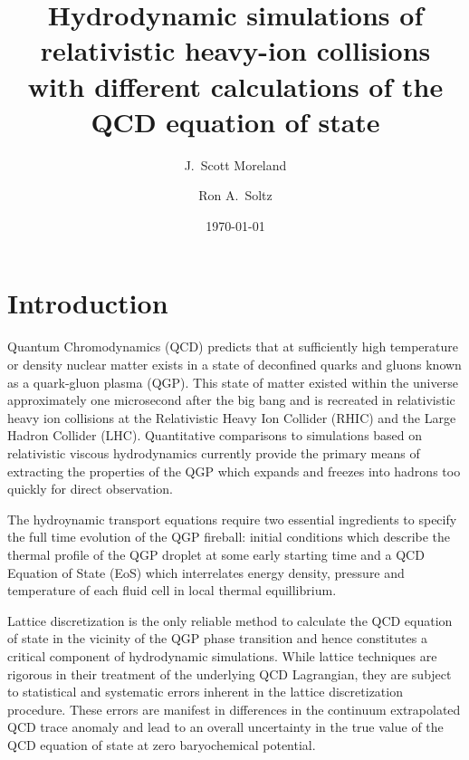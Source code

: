 \documentclass[aps,prc,reprint,amsmath,nofootinbib,superscriptaddress]{revtex4-1}
\begin{document}
\title{Hydrodynamic simulations of relativistic heavy-ion collisions\\ with different calculations of the QCD equation of state}

\author{J.\ Scott Moreland}
\author{Ron A.\ Soltz}

\date{\today}

\begin{abstract} 
   
\end{abstract}

\maketitle

\section{Introduction}

Quantum Chromodynamics (QCD) predicts that at sufficiently high temperature or density nuclear matter exists in a state of deconfined 
quarks and gluons known as a quark-gluon plasma (QGP).   This state of matter existed within the universe approximately one microsecond 
after the big bang and is recreated in relativistic heavy ion collisions at the Relativistic Heavy Ion Collider (RHIC) and the Large Hadron Collider (LHC).
Quantitative comparisons to simulations based on relativistic viscous hydrodynamics currently provide the primary means of extracting the
properties of the QGP which expands and freezes into hadrons too quickly for direct observation.

The hydroynamic transport equations require two essential ingredients to specify the full time evolution of the QGP fireball: initial conditions 
which describe the thermal profile of the QGP droplet at some early starting time and a QCD Equation of State (EoS) which interrelates energy density, 
pressure and temperature of each fluid cell in local thermal equillibrium.

Lattice discretization is the only reliable method to calculate the QCD equation of state in the vicinity of the QGP phase transition and hence 
constitutes a critical component of hydrodynamic simulations. While lattice techniques are rigorous in their treatment of the underlying QCD 
Lagrangian, they are subject to statistical and systematic errors inherent in the lattice discretization procedure. These errors are manifest in differences in the 
continuum extrapolated QCD trace anomaly and lead to an overall uncertainty in the true value of the 
QCD equation of state at zero baryochemical potential.
\end{document}
